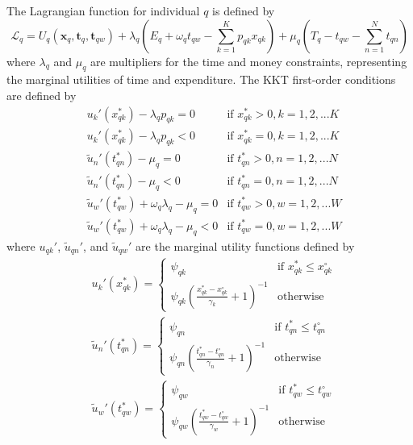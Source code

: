 The Lagrangian function for individual $q$ is defined by
\begin{equation}
    \mathcal{L}_q = U_q\left(\bm{x}_q,\bm{t}_q,\bm{t}_{qw}\right) + \lambda_q\left(E_q + \omega_q t_{qw} - \sum_{k=1}^K p_{qk}x_{qk}\right) + \mu_{q}\left(T_q - t_{qw} - \sum_{n=1}^N t_{qn}\right)
\end{equation}
where $\lambda_q$ and $\mu_q$ are multipliers for the time and money constraints, representing the marginal utilities of time and expenditure. The KKT first-order conditions are defined by
\begin{subequations}\label{eq:kkt1}
    \begin{align}
        &u_k'\left(x_{qk}^*\right) - \lambda_q p_{qk} = 0 & \text{if } x_{qk}^* > 0,k=1,2,...K \\
        &u_k'\left(x_{qk}^*\right) - \lambda_q p_{qk} < 0 & \text{if } x_{qk}^* = 0,k=1,2,...K \\
        &\widetilde{u}_n'\left(t_{qn}^*\right) - \mu_q = 0 & \text{if } t_{qn}^* > 0,n=1,2,...N \\
        &\widetilde{u}_n'\left(t_{qn}^*\right) - \mu_q < 0 & \text{if } t_{qn}^* = 0,n=1,2,...N \\
        &\widetilde{u}_w'\left(t_{qw}^*\right) +\omega_q \lambda_q - \mu_q = 0 & \text{if } t_{qw}^* > 0,w=1,2,...W \\
        &\widetilde{u}_w'\left(t_{qw}^*\right) +\omega_q \lambda_q - \mu_q < 0 & \text{if } t_{qw}^* = 0,w=1,2,...W
    \end{align}
\end{subequations}
where $u_{qk}'$, $\widetilde{u}_{qn}'$, and $\widetilde{u}_{qw}'$ are the marginal utility functions defined by
\begin{subequations}\label{eq:kkt2}
    \begin{align}
        &u_k'(x_{qk}^*) = 
        \begin{cases}
        \psi_{qk} & \text{if } x_{qk}^* \leq x_{qk}^\circ \\
        \psi_{qk}\left(\frac{x_{qk}^* - x_{qk}^\circ}{\gamma_k}+1\right)^{-1} & \text{otherwise}
        \end{cases} \\
        &\widetilde{u}_n'(t_{qn}^*) = 
        \begin{cases}
        \psi_{qn} & \text{if } t_{qn}^* \leq t_{qn}^\circ \\
        \psi_{qn} \left(\frac{t_{qn}^* - t_{qn}^\circ}{\gamma_n}+1\right)^{-1} & \text{otherwise}
        \end{cases} \\
        &\widetilde{u}_w'(t_{qw}^*) = 
        \begin{cases}
        \psi_{qw} & \text{if } t_{qw}^* \leq t_{qw}^\circ \\
        \psi_{qw} \left(\frac{t_{qw}^* - t_{qw}^\circ}{\gamma_w}+1\right)^{-1} & \text{otherwise}
        \end{cases}
    \end{align}
\end{subequations}

